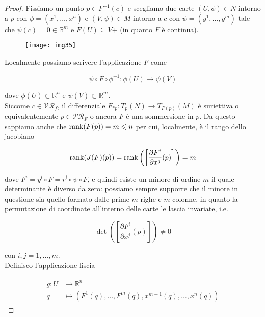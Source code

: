 \begin{proof}
	Fissiamo un punto $ p \in F^{-1}(c) $ e scegliamo due carte $ (U,\phi) \in N $ intorno a $ p $ con $ \phi = (x^{1},\dots,x^{n}) $ e $ (V,\psi) \in M $ intorno a $ c $ con $ \psi = (y^{1},\dots,y^{m}) $ tale che $ \psi(c)=0 \in \mathbb{R}^{m} $ e $ F(U) \subseteq V $+ (in quanto $ F $ è continua).
	
	\begin{figure}[H]
		\centering
		\texttt{[image: img35]}
	\end{figure}

	Localmente possiamo scrivere l'applicazione $ F $ come
	
	\begin{equation}
		\psi \circ F \circ \phi^{-1} : \phi(U) \to \psi(V)
	\end{equation}

	dove $ \phi(U) \subset \mathbb{R}^{n} $ e $ \psi(V) \subset \mathbb{R}^{m} $.\\
	Siccome $ c \in \mathcal{VR}_{f} $, il differenziale $ F_{*p} : T_{p}(N) \to T_{F(p)}(M) $ è suriettiva o equivalentemente $ p \in \mathcal{PR}_{F} $ o ancora $ F $ è una sommersione in $ p $. Da questo sappiamo anche che $ \rank(F(p)) = m \leqslant n $ per cui, localmente, è il rango dello jacobiano
	
	\begin{equation}
		\rank(J(F)(p)) = \rank \left( \left[ \dfrac{\partial F^{i}}{\partial x^{j}} (p) \right] \right) = m
	\end{equation}

	dove $ F^{i} = y^{i} \circ F = r^{i} \circ \psi \circ F $, e quindi esiste un minore di ordine $ m $ il quale determinante è diverso da zero: possiamo sempre supporre che il minore in questione sia quello formato dalle prime $ m $ righe e $ m $ colonne, in quanto la permutazione di coordinate all'interno delle carte le lascia invariate, i.e.
	
	\begin{equation}
		\det( \left[ \dfrac{\partial F^{i}}{\partial x^{j}} (p) \right] ) \neq 0
	\end{equation}

	con $ i,j=1,\dots,m $.\\
	Definisco l'applicazione liscia
	
	\begin{align}
		\begin{split}
			g : U &\to \mathbb{R}^{n}\\
			q &\mapsto (F^{1}(q),\dots,F^{m}(q),x^{m+1}(q),\dots,x^{n}(q))
		\end{split}
	\end{align}


\end{proof}
